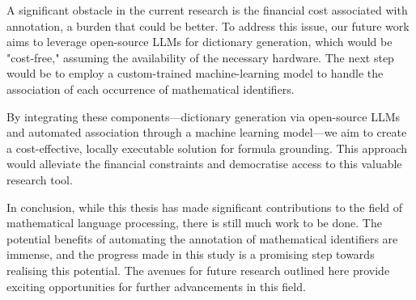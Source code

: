 A significant obstacle in the current research is the financial cost associated with annotation, a burden that could be better. To address this issue, our future work aims to leverage open-source \ac{LLMs} for dictionary generation, which would be "cost-free," assuming the availability of the necessary hardware. The next step would be to employ a custom-trained machine-learning model to handle the association of each occurrence of mathematical identifiers.

By integrating these components—dictionary generation via open-source \ac{LLMs} and automated association through a machine learning model—we aim to create a cost-effective, locally executable solution for formula grounding. This approach would alleviate the financial constraints and democratise access to this valuable research tool.

In conclusion, while this thesis has made significant contributions to the field of mathematical language processing, there is still much work to be done. The potential benefits of automating the annotation of mathematical identifiers are immense, and the progress made in this study is a promising step towards realising this potential. The avenues for future research outlined here provide exciting opportunities for further advancements in this field.